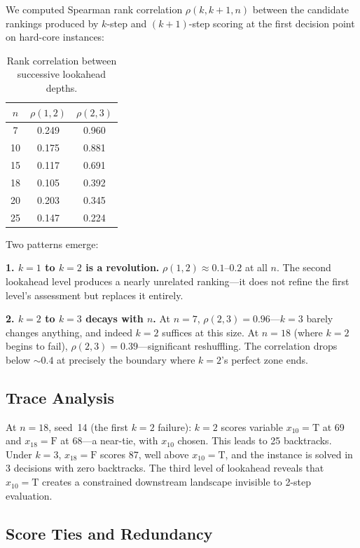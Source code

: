\documentclass[11pt,a4paper]{article}
\begin{document}
We computed Spearman rank correlation $\rho(k, k{+}1, n)$ between the candidate rankings produced by $k$-step and $(k{+}1)$-step scoring at the first decision point on hard-core instances:

\begin{table}[h]
\centering
\begin{tabular}{@{}ccc@{}}
\toprule
$n$ & $\rho(1,2)$ & $\rho(2,3)$ \\
\midrule
7  & 0.249 & 0.960 \\
10 & 0.175 & 0.881 \\
15 & 0.117 & 0.691 \\
18 & 0.105 & 0.392 \\
20 & 0.203 & 0.345 \\
25 & 0.147 & 0.224 \\
\bottomrule
\end{tabular}
\caption{Rank correlation between successive lookahead depths.}
\label{tab:correlation}
\end{table}

Two patterns emerge:

\textbf{1. $k = 1$ to $k = 2$ is a revolution.} $\rho(1,2) \approx 0.1$--$0.2$ at all $n$. The second lookahead level produces a nearly unrelated ranking---it does not refine the first level's assessment but replaces it entirely.

\textbf{2. $k = 2$ to $k = 3$ decays with $n$.} At $n = 7$, $\rho(2,3) = 0.96$---$k = 3$ barely changes anything, and indeed $k = 2$ suffices at this size. At $n = 18$ (where $k = 2$ begins to fail), $\rho(2,3) = 0.39$---significant reshuffling. The correlation drops below ${\sim}0.4$ at precisely the boundary where $k = 2$'s perfect zone ends.

\subsection{Trace Analysis}

At $n = 18$, seed~14 (the first $k = 2$ failure): $k = 2$ scores variable $x_{10} = \mathrm{T}$ at 69 and $x_{18} = \mathrm{F}$ at 68---a near-tie, with $x_{10}$ chosen. This leads to 25 backtracks. Under $k = 3$, $x_{18} = \mathrm{F}$ scores 87, well above $x_{10} = \mathrm{T}$, and the instance is solved in 3 decisions with zero backtracks. The third level of lookahead reveals that $x_{10} = \mathrm{T}$ creates a constrained downstream landscape invisible to 2-step evaluation.

\subsection{Score Ties and Redundancy}
\end{document}
